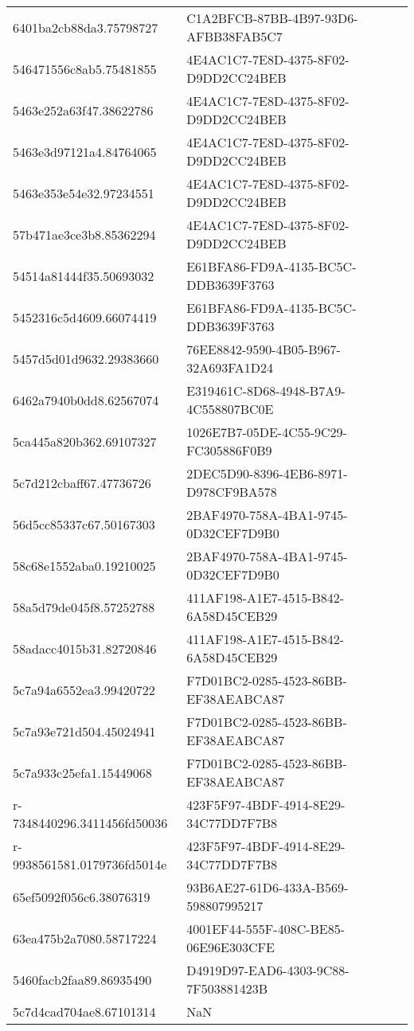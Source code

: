 \begin{tabular}{ll}
6401ba2cb88da3.75798727 & C1A2BFCB-87BB-4B97-93D6-AFBB38FAB5C7 \\
546471556c8ab5.75481855 & 4E4AC1C7-7E8D-4375-8F02-D9DD2CC24BEB \\
5463e252a63f47.38622786 & 4E4AC1C7-7E8D-4375-8F02-D9DD2CC24BEB \\
5463e3d97121a4.84764065 & 4E4AC1C7-7E8D-4375-8F02-D9DD2CC24BEB \\
5463e353e54e32.97234551 & 4E4AC1C7-7E8D-4375-8F02-D9DD2CC24BEB \\
57b471ae3ce3b8.85362294 & 4E4AC1C7-7E8D-4375-8F02-D9DD2CC24BEB \\
54514a81444f35.50693032 & E61BFA86-FD9A-4135-BC5C-DDB3639F3763 \\
5452316c5d4609.66074419 & E61BFA86-FD9A-4135-BC5C-DDB3639F3763 \\
5457d5d01d9632.29383660 & 76EE8842-9590-4B05-B967-32A693FA1D24 \\
6462a7940b0dd8.62567074 & E319461C-8D68-4948-B7A9-4C558807BC0E \\
5ca445a820b362.69107327 & 1026E7B7-05DE-4C55-9C29-FC305886F0B9 \\
5c7d212cbaff67.47736726 & 2DEC5D90-8396-4EB6-8971-D978CF9BA578 \\
56d5cc85337c67.50167303 & 2BAF4970-758A-4BA1-9745-0D32CEF7D9B0 \\
58c68e1552aba0.19210025 & 2BAF4970-758A-4BA1-9745-0D32CEF7D9B0 \\
58a5d79de045f8.57252788 & 411AF198-A1E7-4515-B842-6A58D45CEB29 \\
58adacc4015b31.82720846 & 411AF198-A1E7-4515-B842-6A58D45CEB29 \\
5c7a94a6552ea3.99420722 & F7D01BC2-0285-4523-86BB-EF38AEABCA87 \\
5c7a93e721d504.45024941 & F7D01BC2-0285-4523-86BB-EF38AEABCA87 \\
5c7a933c25efa1.15449068 & F7D01BC2-0285-4523-86BB-EF38AEABCA87 \\
r-7348440296.3411456fd50036 & 423F5F97-4BDF-4914-8E29-34C77DD7F7B8 \\
r-9938561581.0179736fd5014e & 423F5F97-4BDF-4914-8E29-34C77DD7F7B8 \\
65ef5092f056c6.38076319 & 93B6AE27-61D6-433A-B569-598807995217 \\
63ea475b2a7080.58717224 & 4001EF44-555F-408C-BE85-06E96E303CFE \\
5460facb2faa89.86935490 & D4919D97-EAD6-4303-9C88-7F503881423B \\
5c7d4cad704ae8.67101314 & NaN \\

\end{tabular}
